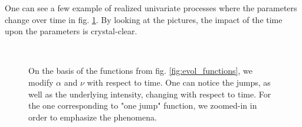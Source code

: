 \documentclass[11pt]{book}
\begin{document}
\vspace{0.5cm}

One can see a few example of realized univariate processes where the parameters change over time in fig. \ref{fig:param_dep_hawkes}. By looking at the pictures, the impact of the time upon the parameters is crystal-clear.


\begin{figure}
\centering
{} 
\\

\caption{On the basis of the functions from fig. \ref{fig:evol_functions}, we modify $\alpha$ and $\nu$ with respect to time. One can notice the jumps, as well as the underlying intensity, changing with respect to time. For the one corresponding to "one jump" function, we zoomed-in in order to emphasize the phenomena.}
\label{fig:param_dep_hawkes}
\end{figure}
\end{document}
